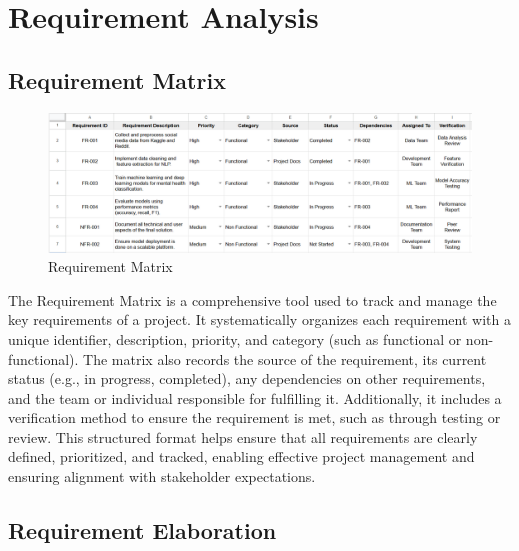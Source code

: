 
\section{Requirement Analysis}

\subsection{Requirement Matrix}
\begin{figure}[h!]  
    \centering
    \includegraphics[width=1.0\textwidth]{Images/Requirement Matrix.png}  
    \caption{Requirement Matrix}
    \label{Requirement Matrix}  %
\end{figure}

\noindent
The Requirement Matrix is a comprehensive tool used to track and manage the key requirements of a project. It systematically organizes each requirement with a unique identifier, description, priority, and category (such as functional or non-functional). The matrix also records the source of the requirement, its current status (e.g., in progress, completed), any dependencies on other requirements, and the team or individual responsible for fulfilling it. Additionally, it includes a verification method to ensure the requirement is met, such as through testing or review. This structured format helps ensure that all requirements are clearly defined, prioritized, and tracked, enabling effective project management and ensuring alignment with stakeholder expectations.

\subsection{Requirement Elaboration}

